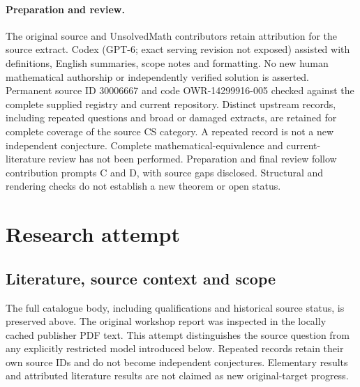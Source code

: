 \documentclass[11pt]{article}
\begin{document}
\paragraph{Preparation and review.}
The original source and UnsolvedMath contributors retain attribution for the source extract. Codex (GPT-6; exact serving revision not exposed) assisted with definitions, English summaries, scope notes and formatting. No new human mathematical authorship or independently verified solution is asserted. Permanent source ID 30006667 and code OWR-14299916-005 checked against the complete supplied registry and current repository. Distinct upstream records, including repeated questions and broad or damaged extracts, are retained for complete coverage of the source CS category. A repeated record is not a new independent conjecture. Complete mathematical-equivalence and current-literature review has not been performed. Preparation and final review follow contribution prompts C and D, with source gaps disclosed. Structural and rendering checks do not establish a new theorem or open status.
\label{end:30006667}

\section{Research attempt}
\subsection{Literature, source context and scope}
The full catalogue body, including qualifications and historical source status, is preserved above. The original workshop report was inspected in the locally cached publisher PDF text. This attempt distinguishes the source question from any explicitly restricted model introduced below. Repeated records retain their own source IDs and do not become independent conjectures. Elementary results and attributed literature results are not claimed as new original-target progress.
\end{document}

